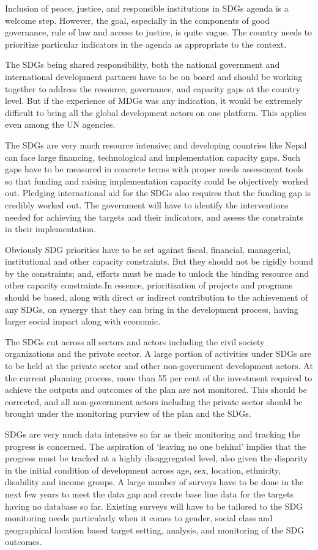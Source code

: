 \documentclass[
  openany]{book}
\begin{document}
Inclusion of peace, justice, and responsible institutions in SDGs agenda is a welcome step. However, the goal, especially in the components of good governance, rule of law and access to justice, is quite vague. The country needs to prioritize particular indicators in the agenda as appropriate to the context.

The SDGs being shared responsibility, both the national government and international development partners have to be on board and should be working together to address the resource, governance, and capacity gaps at the country level. But if the experience of MDGs was any indication, it would be extremely difficult to bring all the global development actors on one platform. This applies even among the UN agencies.

The SDGs are very much resource intensive; and developing countries like Nepal can face large financing, technological and implementation capacity gaps. Such gaps have to be measured in concrete terms with proper needs assessment tools so that funding and raising implementation capacity could be objectively worked out. Pledging international aid for the SDGs also requires that the funding gap is credibly worked out. The government will have to identify the interventions needed for achieving the targets and their indicators, and assess the constraints in their implementation.

Obviously SDG priorities have to be set against fiscal, financial, managerial, institutional and other capacity constraints. But they should not be rigidly bound by the constraints; and, efforts must be made to unlock the binding resource and other capacity constraints.In essence, prioritization of projects and programs should be based, along with direct or indirect contribution to the achievement of any SDGs, on synergy that they can bring in the development process, having larger social impact along with economic.

The SDGs cut across all sectors and actors including the civil society organizations and the private sector. A large portion of activities under SDGs are to be held at the private sector and other non-government development actors. At the current planning process, more than 55 per cent of the investment required to achieve the outputs and outcomes of the plan are not monitored. This should be corrected, and all non-government actors including the private sector should be brought under the monitoring purview of the plan and the SDGs.

SDGs are very much data intensive so far as their monitoring and tracking the progress is concerned. The aspiration of `leaving no one behind' implies that the progress must be tracked at a highly disaggregated level, also given the disparity in the initial condition of development across age, sex, location, ethnicity, disability and income groups. A large number of surveys have to be done in the next few years to meet the data gap and create base line data for the targets having no database so far. Existing surveys will have to be tailored to the SDG monitoring needs particularly when it comes to gender, social class and geographical location based target setting, analysis, and monitoring of the SDG outcomes.
\end{document}
